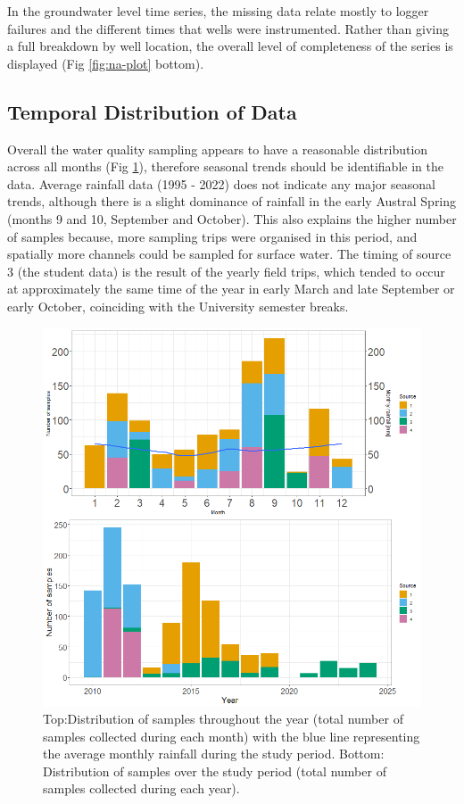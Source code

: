 \documentclass[, manuscript]{copernicus}
\begin{document}
In the groundwater level time series, the missing data relate mostly to
logger failures and the different times that wells were instrumented.
Rather than giving a full breakdown by well location, the overall level
of completeness of the series is displayed (Fig \ref{fig:na-plot}
bottom).

\subsection{Temporal Distribution of Data}

Overall the water quality sampling appears to have a reasonable
distribution across all months (Fig \ref{fig:timedist-plot}), therefore
seasonal trends should be identifiable in the data. Average rainfall
data (1995 - 2022) does not indicate any major seasonal trends, although
there is a slight dominance of rainfall in the early Austral Spring
(months 9 and 10, September and October). This also explains the higher
number of samples because, more sampling trips were organised in this
period, and spatially more channels could be sampled for surface water.
The timing of source 3 (the student data) is the result of the yearly
field trips, which tended to occur at approximately the same time of the
year in early March and late September or early October, coinciding with
the University semester breaks.

\begin{figure}
\includegraphics[width=0.7\linewidth]{Figures/timeDist} \caption{Top:Distribution of samples throughout the year (total number of samples collected during each month) with the blue line representing the average monthly rainfall during the study period. Bottom: Distribution of samples over the study period (total number of samples collected during each year).}\label{fig:timedist-plot}
\end{figure}
\end{document}
